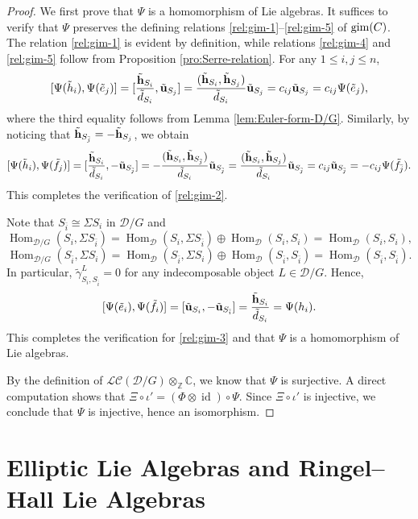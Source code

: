 \documentclass[12pt,reqno]{amsart}
\numberwithin{equation}{section}
\newcommand{\Hom}{\operatorname{Hom}\nolimits}
\newcommand{\id}{\operatorname{id}\nolimits}
\begin{document}
	\begin{proof}
		We first prove that $\Psi$ is a homomorphism of Lie algebras. It suffices to verify that $\Psi$ preserves the defining relations \eqref{rel:gim-1}--\eqref{rel:gim-5} of ${\rm gim}(C)$. The relation \eqref{rel:gim-1} is evident by definition, while relations \eqref{rel:gim-4} and \eqref{rel:gim-5} follow from Proposition \ref{pro:Serre-relation}.
		For any $1\leq i,j\leq n$,
		\[
		[\Psi(\tilde{h}_i),\Psi(\tilde{e}_j)]=[\frac{\tilde{\bf h}_{S_i}}{\tilde{d}_{S_i}},\tilde{\bf u}_{S_j}]
		=\frac{(\tilde{\bf h}_{S_i},\tilde{\bf h}_{S_j})}{\tilde{d}_{S_i}}\tilde{\bf u}_{S_j}
		=c_{ij}\tilde{\bf u}_{S_j}=c_{ij}\Psi(\tilde{e}_j),
		\]
		where the third equality follows from Lemma \ref{lem:Euler-form-D/G}. Similarly, by noticing that $\tilde{\bf h}_{S_{\bar{j}}}=-\tilde{\bf h}_{S_j}$, we obtain
		\[
		[\Psi(\tilde{h}_i),\Psi(\tilde{f}_j)]=[\frac{\tilde{\bf h}_{S_i}}{\tilde{d}_{S_i}},-\tilde{\bf u}_{S_{\bar{j}}}]
		=-\frac{(\tilde{\bf h}_{S_i},\tilde{\bf h}_{S_{\bar{j}}})}{\tilde{d}_{S_i}}\tilde{\bf u}_{S_{\bar{j}}}=\frac{(\tilde{\bf h}_{S_i},\tilde{\bf h}_{S_{{j}}})}{\tilde{d}_{S_i}}\tilde{\bf u}_{S_{\bar{j}}}
		=c_{ij}\tilde{\bf u}_{S_{\bar{j}}}=-c_{ij}\Psi(\tilde{f}_{\bar{j}}).
		\]
		This completes the verification of \eqref{rel:gim-2}.
		
		Note that $S_{\bar{i}}\cong \Sigma S_i$ in $\mathcal{D}/G$ and 
		\[
		\Hom_{\mathcal{D}/G}(S_i,\Sigma S_{\bar{i}})=\Hom_{\mathcal{D}}(S_i,\Sigma S_{\bar{i}})\oplus \Hom_{\mathcal{D}}(S_i,S_i)=\Hom_{\mathcal{D}}(S_i,S_i),
		\]
		\[
		\Hom_{\mathcal{D}/G}(S_{\bar{i}},\Sigma S_{{i}})=\Hom_{\mathcal{D}}(S_{\bar{i}},\Sigma S_{{i}})\oplus \Hom_{\mathcal{D}}(S_{\bar{i}},S_{\bar{i}})=\Hom_{\mathcal{D}}(S_{\bar{i}},S_{\bar{i}}).
		\]
		In particular, $\tilde{\gamma}_{S_i,S_{\bar{i}}}^L=0$ for any indecomposable object $L\in \mathcal{D}/G$. Hence, \[[\Psi(\tilde{e}_i),\Psi(\tilde{f}_i)]=[\tilde{\bf u}_{S_i},-\tilde{\bf u}_{S_{\bar{i}}}]=\frac{\tilde{\bf h}_{S_i}}{\tilde{d}_{S_i}}=\Psi(h_i).\] This completes the verification for \eqref{rel:gim-3} and that $\Psi$ is a homomorphism of Lie algebras.
		
		By the definition of $\mathscr{LC}(\mathcal{D}/G)\otimes_{\mathbb{Z}} \mathbb{C}$, we know that $\Psi$ is surjective. A direct computation shows that $\Xi\circ \iota'=(\Phi\otimes\id)\circ \Psi$. Since $\Xi\circ \iota'$ is injective, we conclude that $\Psi$ is injective, hence an isomorphism.
	\end{proof}
	
	
	\section{Elliptic Lie Algebras and Ringel--Hall Lie Algebras}
	\label{sec:ell-Lie}
	
\end{document}
